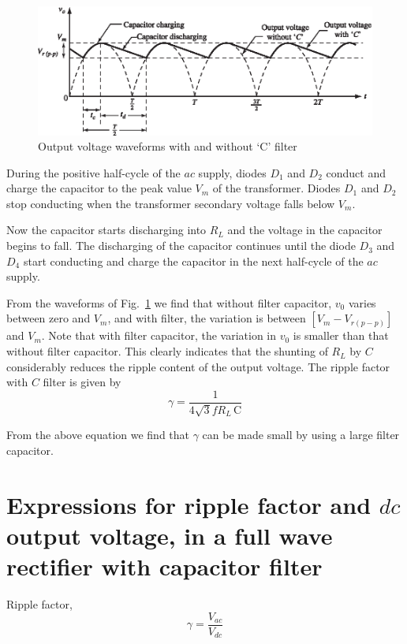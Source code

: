\begin{figure}[H]
\centering
\includegraphics[scale=.95]{chap2/add-fig/S3-EE-02-018.eps}
\caption{Output voltage waveforms with and without `C' filter}\label{fig2.18}
\end{figure}
During the positive half-cycle of the $ac$ supply, diodes $D_1$ and
$D_2$ conduct and charge the capacitor to the peak value $V_m$ of the
transformer. Diodes $D_1$ and $D_2$ stop  conducting when the
transformer secondary voltage falls below $V_m$.

Now the capacitor starts discharging into $R_L$ and the voltage in the
capacitor begins to fall. The discharging of the capacitor continues
until the diode $D_3$ and $D_4$ start conducting and charge the
capacitor in the next half-cycle of the $ac$ supply. 

From the waveforms of Fig.~\ref{fig2.18} we find that without filter capacitor,
$v_0$ varies between zero and $V_m$, and with filter, the variation is
between $[V_m - V_{r(p-p)}]$ and $V_m$. Note that with filter
capacitor, the variation in $v_0$ is smaller than that without filter
capacitor. This clearly indicates that the shunting of $R_L$ by $C$
considerably reduces the ripple content of the output voltage. The
ripple factor with $C$ filter is given by
\begin{equation}
\gamma = \frac{1}{4 \sqrt{3} f R_L \,\text{C}} \label{eq2.56}
\end{equation}

From the above equation we find that $\gamma$ can be made small by
using a large filter capacitor.

\section{Expressions for ripple factor and $dc$ output voltage, in a
  full wave rectifier with capacitor filter}\label{sec2.23}

Ripple factor, 
\begin{equation}
\gamma = \frac{V_{ac}}{V_{dc}} \label{eq2.57}
\end{equation}

